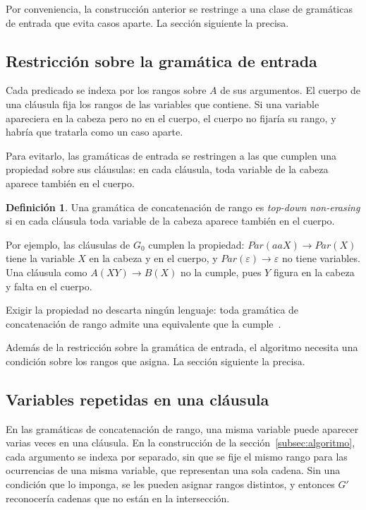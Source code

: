 \documentclass{report}
\theoremstyle{definition}
\newtheorem{definicion}{Definición}[chapter]
\theoremstyle{plain}
\theoremstyle{remark}
\begin{document}
Por conveniencia, la construcción anterior se restringe a una clase
de gramáticas de entrada que evita casos aparte. La sección siguiente
la precisa.

\subsection{Restricción sobre la gramática de entrada}

Cada predicado se indexa por los rangos sobre $A$ de sus argumentos.
El cuerpo de una cláusula fija los rangos de las variables que
contiene. Si una variable apareciera en la cabeza pero no en el
cuerpo, el cuerpo no fijaría su rango, y habría que tratarla como un
caso aparte.

Para evitarlo, las gramáticas de entrada se restringen a las que
cumplen una propiedad sobre sus cláusulas: en cada cláusula, toda
variable de la cabeza aparece también en el cuerpo.

\begin{definicion}
Una gramática de concatenación de rango es \emph{top-down non-erasing}
si en cada cláusula toda variable de la cabeza aparece también en el
cuerpo.
\end{definicion}

Por ejemplo, las cláusulas de $G_0$ cumplen la propiedad:
$Par(aaX) \to Par(X)$ tiene la variable $X$ en la cabeza y en el
cuerpo, y $Par(\varepsilon) \to \varepsilon$ no tiene variables. Una
cláusula como $A(XY) \to B(X)$ no la cumple, pues $Y$ figura en la
cabeza y falta en el cuerpo.

Exigir la propiedad no descarta ningún lenguaje: toda gramática de
concatenación de rango admite una equivalente que la
cumple~\cite{boullier1998proposal, kallmeyer2010parsing}.

Además de la restricción sobre la gramática de entrada, el algoritmo
necesita una condición sobre los rangos que asigna. La sección
siguiente la precisa.

\subsection{Variables repetidas en una cláusula}

En las gramáticas de concatenación de rango, una misma variable puede
aparecer varias veces en una cláusula. En la construcción de la
sección~\ref{subsec:algoritmo}, cada argumento se indexa por separado,
sin que se fije el mismo rango para las ocurrencias de una misma
variable, que representan una sola cadena.
Sin una condición que lo imponga, se les pueden asignar rangos
distintos, y entonces $G'$ reconocería cadenas que no están en la
intersección.
\end{document}
